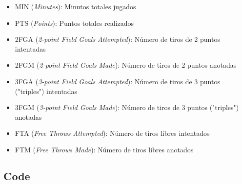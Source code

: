\documentclass[paper=a4, fontsize=9pt]{article}
\begin{document}
\begin{itemize}
\item MIN (\emph{Minutes}): Minutos totales jugados
\item PTS (\emph{Points}): Puntos totales realizados
\item 2FGA (\emph{2-point Field Goals Attempted}): Número de tiros de 2 puntos intentadas
\item 2FGM (\emph{2-point Field Goals Made}): Número de tiros de 2 puntos anotadas
\item 3FGA (\emph{3-point Field Goals Attempted}): Número de tiros de 3 puntos ("triples") intentadas
\item 3FGM (\emph{3-point Field Goals Made}): Número de tiros de 3 puntos ("triples") anotadas
\item FTA (\emph{Free Throws Attempted}): Número de tiros libres intentados
\item FTM (\emph{Free Throws Made}): Número de tiros libres anotados
\end{itemize}

\clearpage

\subsection{Code} \label{sec:Annexo2}
\end{document}
